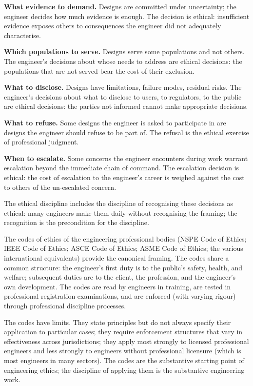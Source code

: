 \textbf{What evidence to demand.} Designs are committed under uncertainty; the engineer decides how much evidence is enough. The decision is ethical: insufficient evidence exposes others to consequences the engineer did not adequately characterise.

\textbf{Which populations to serve.} Designs serve some populations and not others. The engineer's decisions about whose needs to address are ethical decisions: the populations that are not served bear the cost of their exclusion.

\textbf{What to disclose.} Designs have limitations, failure modes, residual risks. The engineer's decisions about what to disclose to users, to regulators, to the public are ethical decisions: the parties not informed cannot make appropriate decisions.

\textbf{What to refuse.} Some designs the engineer is asked to participate in are designs the engineer should refuse to be part of. The refusal is the ethical exercise of professional judgment.

\textbf{When to escalate.} Some concerns the engineer encounters during work warrant escalation beyond the immediate chain of command. The escalation decision is ethical: the cost of escalation to the engineer's career is weighed against the cost to others of the un-escalated concern.

The ethical discipline includes the discipline of recognising these decisions as ethical: many engineers make them daily without recognising the framing; the recognition is the precondition for the discipline.

The codes of ethics of the engineering professional bodies (NSPE Code of Ethics; IEEE Code of Ethics; ASCE Code of Ethics; ASME Code of Ethics; the various international equivalents) provide the canonical framing. The codes share a common structure: the engineer's first duty is to the public's safety, health, and welfare; subsequent duties are to the client, the profession, and the engineer's own development. The codes are read by engineers in training, are tested in professional registration examinations, and are enforced (with varying rigour) through professional discipline processes.

The codes have limits. They state principles but do not always specify their application to particular cases; they require enforcement structures that vary in effectiveness across jurisdictions; they apply most strongly to licensed professional engineers and less strongly to engineers without professional licensure (which is most engineers in many sectors). The codes are the substantive starting point of engineering ethics; the discipline of applying them is the substantive engineering work.

